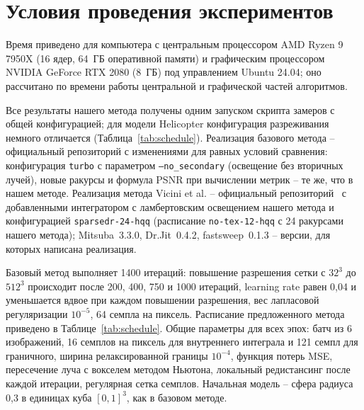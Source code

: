 

\section{Условия проведения экспериментов}

Время приведено для компьютера с центральным процессором AMD Ryzen 9 7950X (16 ядер, 64~ГБ оперативной памяти) и графическим процессором NVIDIA GeForce RTX 2080 (8~ГБ) под управлением Ubuntu 24.04; оно рассчитано по времени работы центральной и графической частей алгоритмов.

Все результаты нашего метода получены одним запуском скрипта замеров с общей конфигурацией; для модели Helicopter конфигурация разреживания немного отличается (Таблица~\ref{tab:schedule}). Реализация базового метода -- официальный репозиторий \cite{DRSDF24Repo} с изменениями для равных условий сравнения: конфигурация \texttt{turbo} с параметром \texttt{--no\_secondary} (освещение без вторичных лучей), новые ракурсы и формула PSNR при вычислении метрик -- те же, что в нашем методе. Реализация метода Vicini et al. -- официальный репозиторий~\cite{WASSDF2022Repo} с добавленными интегратором с ламбертовским освещением нашего метода и конфигурацией \texttt{sparsedr-24-hqq} (расписание \texttt{no-tex-12-hqq} с 24 ракурсами нашего метода); Mitsuba~3.3.0, Dr.Jit~0.4.2, fastsweep~0.1.3 -- версии, для которых написана реализация.

Базовый метод выполняет 1400 итераций: повышение разрешения сетки с $32^3$ до $512^3$ происходит после 200, 400, 750 и 1000 итераций, learning rate равен 0,04 и уменьшается вдвое при каждом повышении разрешения, вес лапласовой регуляризации $10^{-5}$, 64 семпла на пиксель. Расписание предложенного метода приведено в Таблице~\ref{tab:schedule}. Общие параметры для всех эпох: батч из 6 изображений, 16 семплов на пиксель для внутреннего интеграла и 121 семпл для граничного, ширина релаксированной границы $10^{-4}$, функция потерь MSE, пересечение луча с вокселем методом Ньютона, локальный редистансинг после каждой итерации, регулярная сетка семплов. Начальная модель -- сфера радиуса 0,3 в единицах куба $[0,1]^3$, как в базовом методе.

